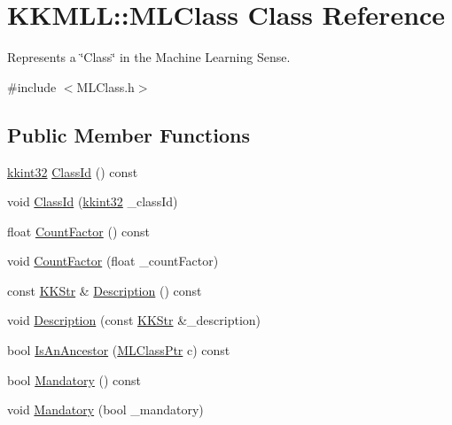 \hypertarget{class_k_k_m_l_l_1_1_m_l_class}{}\section{K\+K\+M\+LL\+:\+:M\+L\+Class Class Reference}
\label{class_k_k_m_l_l_1_1_m_l_class}


Represents a \char`\"{}\+Class\char`\"{} in the Machine Learning Sense.  




{\ttfamily \#include $<$M\+L\+Class.\+h$>$}

\subsection*{Public Member Functions}
\begin{DoxyCompactItemize}
\item 
\hyperlink{namespace_k_k_b_a8fa4952cc84fda1de4bec1fbdd8d5b1b}{kkint32} \hyperlink{class_k_k_m_l_l_1_1_m_l_class_a6f43c806496aaef671a31f7631b45c71}{Class\+Id} () const 
\item 
void \hyperlink{class_k_k_m_l_l_1_1_m_l_class_a2c483f5afa103e360052b42c6753c2d2}{Class\+Id} (\hyperlink{namespace_k_k_b_a8fa4952cc84fda1de4bec1fbdd8d5b1b}{kkint32} \+\_\+class\+Id)
\item 
float \hyperlink{class_k_k_m_l_l_1_1_m_l_class_a06eceea83b66e335a96da35edcfaf076}{Count\+Factor} () const 
\item 
void \hyperlink{class_k_k_m_l_l_1_1_m_l_class_a0d2220eaffaef7a957ffd15343f0323a}{Count\+Factor} (float \+\_\+count\+Factor)
\item 
const \hyperlink{class_k_k_b_1_1_k_k_str}{K\+K\+Str} \& \hyperlink{class_k_k_m_l_l_1_1_m_l_class_ab19cb2699e1e0a93bf51afb861b6deca}{Description} () const 
\item 
void \hyperlink{class_k_k_m_l_l_1_1_m_l_class_aa77abd065115f6e3b5087b048eda1a94}{Description} (const \hyperlink{class_k_k_b_1_1_k_k_str}{K\+K\+Str} \&\+\_\+description)
\item 
bool \hyperlink{class_k_k_m_l_l_1_1_m_l_class_a5dcfafbcd5d9cfcd84b985bb3fa460a1}{Is\+An\+Ancestor} (\hyperlink{namespace_k_k_m_l_l_ac272393853d59e72e8456f14cd6d8c23}{M\+L\+Class\+Ptr} c) const 
\item 
bool \hyperlink{class_k_k_m_l_l_1_1_m_l_class_ac0dfe6cd6c3c8a5da3d6298631043b93}{Mandatory} () const 
\item 
void \hyperlink{class_k_k_m_l_l_1_1_m_l_class_a3ca632f308a88bc34817f0410f4bbd2c}{Mandatory} (bool \+\_\+mandatory)

\end{DoxyCompactItemize}
